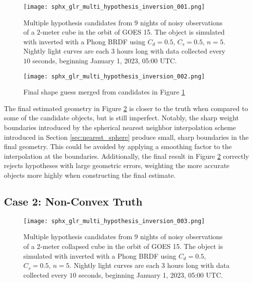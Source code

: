 \begin{figure}[!htb]
    \centering
    \texttt{[image: sphx\_glr\_multi\_hypothesis\_inversion\_001.png]}
    \caption{Multiple hypothesis candidates from 9 nights of noisy observations of a $2$-meter cube in the orbit of GOES 15. The object is simulated with inverted with a Phong BRDF using $C_d=0.5$, $C_s=0.5$, $n=5$. Nightly light curves are each $3$ hours long with data collected every $10$ seconds, beginning January 1, 2023, 05:00 UTC.}
    \label{fig:multi_hyp_candidates_cvx}
\end{figure}

\begin{figure}[!htb]
  \centering
  \texttt{[image: sphx\_glr\_multi\_hypothesis\_inversion\_002.png]}
  \caption{Final shape guess merged from candidates in Figure \ref{fig:multi_hyp_candidates_cvx}}
  \label{fig:multi_hyp_final_cvx}
\end{figure}

The final estimated geometry in Figure \ref{fig:multi_hyp_final_cvx} is closer to the truth when compared to some of the candidate objects, but is still imperfect. Notably, the sharp weight boundaries introduced by the spherical nearest neighbor interpolation scheme introduced in Section \ref{sec:nearest_sphere} produce small, sharp boundaries in the final geometry. This could be avoided by applying a smoothing factor to the interpolation at the boundaries. Additionally, the final result in Figure \ref{fig:multi_hyp_final_cvx} correctly rejects hypotheses with large geometric errors, weighting the more accurate objects more highly when constructing the final estimate.

\subsection{Case 2: Non-Convex Truth}

\begin{figure}[!htb]
  \centering
  \texttt{[image: sphx\_glr\_multi\_hypothesis\_inversion\_003.png]}
  \caption{Multiple hypothesis candidates from 9 nights of noisy observations of a $2$-meter collapsed cube in the orbit of GOES 15. The object is simulated with inverted with a Phong BRDF using $C_d=0.5$, $C_s=0.5$, $n=5$. Nightly light curves are each $3$ hours long with data collected every $10$ seconds, beginning January 1, 2023, 05:00 UTC.}
  \label{fig:multi_hyp_candidates_ncvx}
\end{figure}

